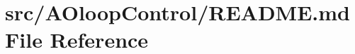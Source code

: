 \hypertarget{src_2AOloopControl_2README_8md}{}\section{src/\+A\+Oloop\+Control/\+R\+E\+A\+D\+M\+E.md File Reference}
\label{src_2AOloopControl_2README_8md}
